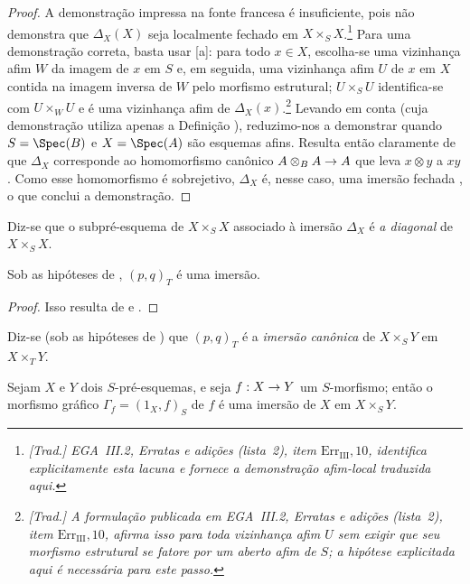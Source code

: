 \documentclass[oneside]{amsart}
\makeatletter
\newcommand{\ega@arrow}[2]{\mathchoice{#1}{#2}{#2}{#2}}
\renewcommand{\to}{\ega@arrow{\longrightarrow}{\rightarrow}}
\let\EGAOriginalLabel\label
\renewcommand{\label}[1]{\phantomsection\EGAOriginalLabel{#1}}
\makeatother
\begin{document}
\begin{proof}
A demonstração impressa na fonte francesa é insuficiente, pois não demonstra que $\Delta_X(X)$ seja localmente fechado em $X\times_S X$.\footnote{\emph{[Trad.] EGA~III.2, Erratas e adições (lista~2), item $\mathrm{Err}_{\mathrm{III}},10$, identifica explicitamente esta lacuna e fornece a demonstração afim-local traduzida aqui.}}
Para uma demonstração correta, basta usar [a]:
para todo $x\in X$, escolha-se uma vizinhança afim $W$ da imagem de $x$ em $S$ e, em seguida, uma vizinhança afim $U$ de $x$ em $X$ contida na imagem inversa de $W$ pelo morfismo estrutural;
$U\times_S U$ identifica-se com $U\times_W U$ e é uma vizinhança afim de $\Delta_X(x)$.\footnote{\emph{[Trad.] A formulação publicada em EGA~III.2, Erratas e adições (lista~2), item $\mathrm{Err}_{\mathrm{III}},10$, afirma isso para toda vizinhança afim $U$ sem exigir que seu morfismo estrutural se fatore por um aberto afim de $S$; a hipótese explicitada aqui é necessária para este passo.}}
Levando em conta  (cuja demonstração utiliza apenas a Definição
), reduzimo-nos a demonstrar  quando
$S=\Spec(B)$ e $X=\Spec(A)$ são esquemas afins.
Resulta então claramente de  que $\Delta_X$ corresponde ao
homomorfismo canônico $A\otimes_B A\to A$ que leva $x\otimes y$ a $xy$.
Como esse homomorfismo é sobrejetivo, $\Delta_X$ é, nesse caso, uma imersão
fechada , o que conclui a demonstração.
\end{proof}

Diz-se que o subpré-esquema de $X\times_S X$ associado à imersão $\Delta_X$  é \emph{a diagonal} de $X\times_S X$.

\begin{corollary}[5.3.10]
\label{I.5.3.10}
Sob as hipóteses de , $(p,q)_T$ é uma imersão.
\end{corollary}

\begin{proof}
Isso resulta de  e .
\end{proof}

Diz-se (sob as hipóteses de ) que $(p,q)_T$ é a \emph{imersão canônica} de $X\times_S Y$ em $X\times_T Y$.

\begin{corollary}[5.3.11]
\label{I.5.3.11}
Sejam $X$ e $Y$ dois $S$-pré-esquemas, e seja $f:X\to Y$ um $S$-morfismo;
então o morfismo gráfico $\Gamma_f=(1_X,f)_S$ de $f$  é uma imersão de $X$ em $X\times_S Y$.
\end{corollary}
\end{document}
